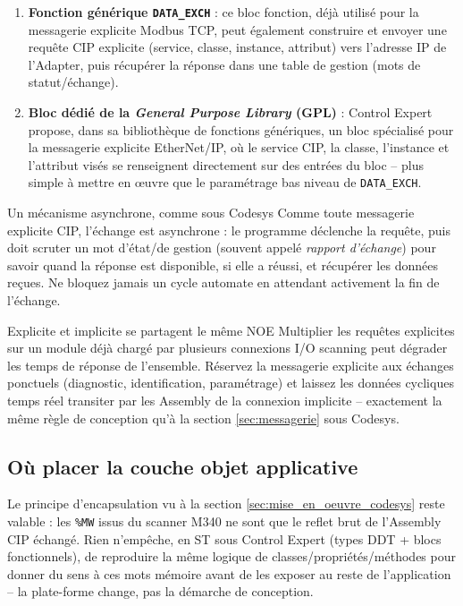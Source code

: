 \begin{enumerate}
    \item \textbf{Fonction générique \texttt{DATA\_EXCH}} : ce bloc fonction, déjà utilisé pour la messagerie explicite Modbus TCP, peut également construire et envoyer une requête CIP explicite (service, classe, instance, attribut) vers l'adresse IP de l'Adapter, puis récupérer la réponse dans une table de gestion (mots de statut/échange).
    \item \textbf{Bloc dédié de la \emph{General Purpose Library} (GPL)} : Control Expert propose, dans sa bibliothèque de fonctions génériques, un bloc spécialisé pour la messagerie explicite EtherNet/IP, où le service CIP, la classe, l'instance et l'attribut visés se renseignent directement sur des entrées du bloc -- plus simple à mettre en \oe uvre que le paramétrage bas niveau de \texttt{DATA\_EXCH}.
\end{enumerate}

\begin{UPSTIinfor}{Un mécanisme asynchrone, comme sous Codesys}
    Comme toute messagerie explicite CIP, l'échange est asynchrone : le programme déclenche la requête, puis doit scruter un mot d'état/de gestion (souvent appelé \emph{rapport d'échange}) pour savoir quand la réponse est disponible, si elle a réussi, et récupérer les données reçues. Ne bloquez jamais un cycle automate en attendant activement la fin de l'échange.
\end{UPSTIinfor}

\begin{UPSTIwarning}{Explicite et implicite se partagent le même NOE}
    Multiplier les requêtes explicites sur un module déjà chargé par plusieurs connexions I/O scanning peut dégrader les temps de réponse de l'ensemble. Réservez la messagerie explicite aux échanges ponctuels (diagnostic, identification, paramétrage) et laissez les données cycliques temps réel transiter par les Assembly de la connexion implicite -- exactement la même règle de conception qu'à la section \ref{sec:messagerie} sous Codesys.
\end{UPSTIwarning}

\subsection{Où placer la couche objet applicative}
Le principe d'encapsulation vu à la section \ref{sec:mise_en_oeuvre_codesys} reste valable : les \texttt{\%MW} issus du scanner M340 ne sont que le reflet brut de l'Assembly CIP échangé. Rien n'empêche, en ST sous Control Expert (types DDT + blocs fonctionnels), de reproduire la même logique de classes/propriétés/méthodes pour donner du sens à ces mots mémoire avant de les exposer au reste de l'application -- la plate-forme change, pas la démarche de conception.


